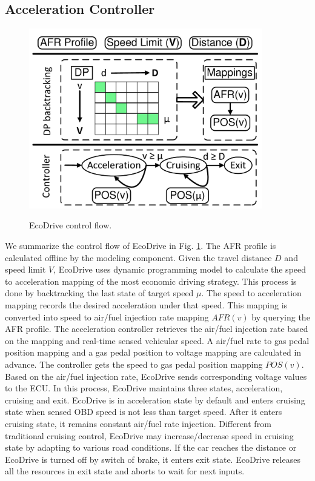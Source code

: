 \subsection{Acceleration Controller}


\begin{figure}[t]
\begin{center}
\vspace{-0.2cm}
\includegraphics[width=4.0in,angle=0]{Figs/EcoDrive/controlflow.pdf}
\vspace{-0.0cm}
\caption{EcoDrive control flow.}
\vspace{-0.5cm}
\label{controlflow}
\end{center}
\end{figure}



We summarize the control flow of EcoDrive in Fig. \ref{controlflow}. 
The AFR profile is calculated offline by the modeling component. 
Given the travel distance $D$ and speed limit $V$, 
EcoDrive uses dynamic programming model to calculate the speed
to acceleration mapping of the most economic driving strategy. 
This process is done by backtracking the last state of target speed $\mu$. 
The speed to acceleration mapping records the desired
acceleration under that speed. 
This mapping is converted into speed to air/fuel injection rate
mapping $AFR(v)$ by querying the AFR profile. 
The acceleration controller retrieves the air/fuel injection
rate based on the mapping and real-time sensed vehicular speed. 
A air/fuel rate to gas pedal position mapping and 
a gas pedal position to voltage mapping are calculated in advance.
The controller gets the speed to gas pedal position mapping $POS(v)$.  
Based on the air/fuel injection rate, EcoDrive sends 
corresponding voltage values to the ECU. 
In this process, EcoDrive maintains three states, 
acceleration, cruising and exit. 
EcoDrive is in acceleration state by default and enters
cruising state when sensed OBD speed is not less than target speed. 
After it enters cruising state, it remains constant air/fuel
rate injection. 
Different from traditional cruising control, 
EcoDrive may increase/decrease speed in cruising state
by adapting to various road conditions. 
If the car reaches the distance or EcoDrive is turned off
by switch of brake, it enters exit state. 
EcoDrive releases all the resources in exit state
and aborts to wait for next inputs. 


